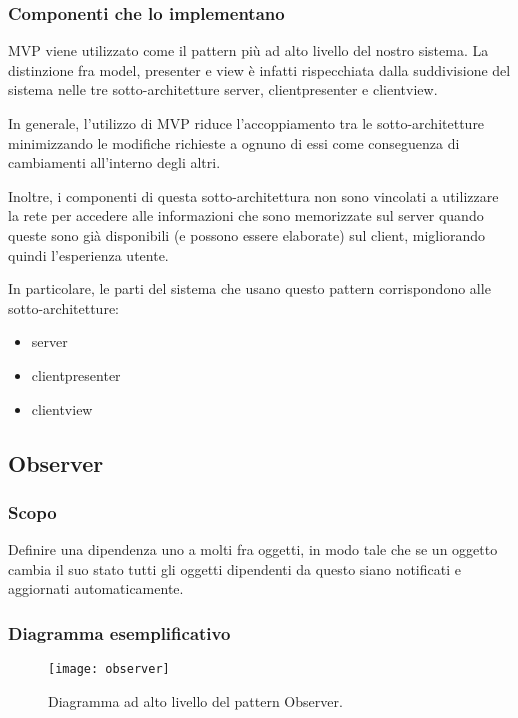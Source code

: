 \subsubsection{Componenti che lo implementano}
MVP viene utilizzato come il pattern più ad alto livello del nostro sistema. La distinzione fra model, presenter e view è infatti rispecchiata dalla suddivisione del sistema nelle tre sotto-architetture server, clientpresenter e clientview.

In generale, l'utilizzo di MVP riduce l'accoppiamento tra le sotto-architetture minimizzando le modifiche richieste a ognuno di essi come conseguenza di cambiamenti all'interno degli altri.

Inoltre, i componenti di questa sotto-architettura non sono vincolati a utilizzare la rete per accedere alle informazioni che sono memorizzate sul server quando queste sono già disponibili (e possono essere elaborate) sul client, migliorando quindi l'esperienza utente.

In particolare, le parti del sistema che usano questo pattern corrispondono alle sotto-architetture:
\begin{itemize}[noitemsep,nolistsep]
  \item server
  \item clientpresenter
  \item clientview
\end{itemize}

\subsection{Observer}

\subsubsection{Scopo}
Definire una dipendenza uno a molti fra oggetti, in modo tale che se un oggetto cambia il suo stato tutti gli oggetti dipendenti da questo siano notificati e aggiornati automaticamente.

\subsubsection{Diagramma esemplificativo}
\begin{figure}[H]
\centering
\texttt{[image: observer]}
\caption{Diagramma ad alto livello del pattern Observer.}\label{fig:observer}
\end{figure}

